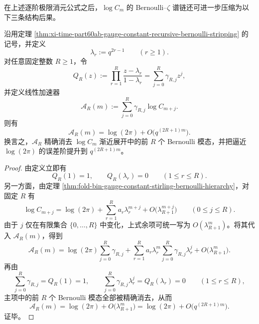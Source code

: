 在上述逐阶极限消元公式之后，\(\log C_m\) 的 Bernoulli--\(\zeta\) 谱链还可进一步压缩为以下三条结构后果。

\begin{theorem}\label{thm:xi-time-part60ab-gauge-constant-richardson-neville-accelerator}
沿用定理 \ref{thm:xi-time-part60ab-gauge-constant-recursive-bernoulli-stripping} 的记号，并定义
\[
\lambda_r:=q^{2r-1}
\qquad (r\ge 1).
\]
对任意固定整数 \(R\ge 1\)，令
\[
Q_R(z):=\prod_{r=1}^{R}\frac{z-\lambda_r}{1-\lambda_r}
=
\sum_{j=0}^{R}\gamma_{R,j}z^j,
\]
并定义线性加速器
\[
\mathcal A_R(m):=\sum_{j=0}^{R}\gamma_{R,j}\log C_{m+j}.
\]
则有
\[
\boxed{\;
\mathcal A_R(m)=\log(2\pi)+O\!\bigl(q^{(2R+1)m}\bigr).\;}
\]
换言之，\(\mathcal A_R\) 精确消去 \(\log C_m\) 渐近展开中的前 \(R\) 个 Bernoulli 模态，并把逼近 \(\log(2\pi)\) 的误差阶提升到 \(q^{(2R+1)m}\)。
\end{theorem}
\begin{proof}
由定义立即有
\[
Q_R(1)=1,
\qquad
Q_R(\lambda_r)=0
\qquad (1\le r\le R).
\]
另一方面，由定理 \ref{thm:fold-bin-gauge-constant-stirling-bernoulli-hierarchy}，对固定 \(R\) 有
\[
\log C_{m+j}
=
\log(2\pi)+\sum_{r=1}^{R}a_r\lambda_r^{m+j}
+O\!\bigl(\lambda_{R+1}^{m+j}\bigr)
\qquad (0\le j\le R).
\]
由于 \(j\) 仅在有限集合 \(\{0,\dots,R\}\) 中变化，上式余项可统一写为 \(O(\lambda_{R+1}^m)\)。将其代入 \(\mathcal A_R(m)\)，得到
\[
\mathcal A_R(m)
=
\log(2\pi)\sum_{j=0}^{R}\gamma_{R,j}
+\sum_{r=1}^{R}a_r\lambda_r^m\sum_{j=0}^{R}\gamma_{R,j}\lambda_r^j
+O\!\bigl(\lambda_{R+1}^m\bigr).
\]
再由
\[
\sum_{j=0}^{R}\gamma_{R,j}=Q_R(1)=1,
\qquad
\sum_{j=0}^{R}\gamma_{R,j}\lambda_r^j=Q_R(\lambda_r)=0
\qquad (1\le r\le R),
\]
主项中的前 \(R\) 个 Bernoulli 模态全部被精确消去，从而
\[
\mathcal A_R(m)
=
\log(2\pi)+O\!\bigl(\lambda_{R+1}^m\bigr)
=
\log(2\pi)+O\!\bigl(q^{(2R+1)m}\bigr).
\]
证毕。
\end{proof}

